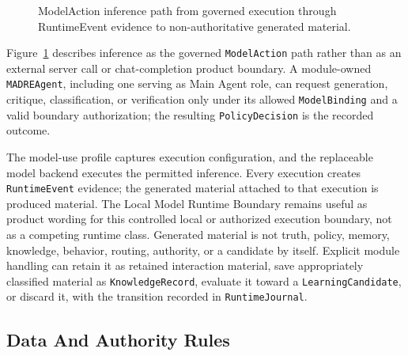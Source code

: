 \documentclass[11pt]{report}
\begin{document}
\begin{figure}[H]
{%
	}
	\caption{ModelAction inference path from governed execution through RuntimeEvent evidence to non-authoritative generated material.}
	\label{fig:madre-model-invocation-action}
\end{figure}

Figure~\ref{fig:madre-model-invocation-action} describes inference as the governed \texttt{ModelAction} path rather than as an external server call or chat-completion product boundary. A module-owned \texttt{MADREAgent}, including one serving as Main Agent role, can request generation, critique, classification, or verification only under its allowed \texttt{ModelBinding} and a valid boundary authorization; the resulting \texttt{PolicyDecision} is the recorded outcome.

The model-use profile captures execution configuration, and the replaceable model backend executes the permitted inference. Every execution creates \texttt{RuntimeEvent} evidence; the generated material attached to that execution is produced material. The Local Model Runtime Boundary remains useful as product wording for this controlled local or authorized execution boundary, not as a competing runtime class. Generated material is not truth, policy, memory, knowledge, behavior, routing, authority, or a candidate by itself. Explicit module handling can retain it as retained interaction material, save appropriately classified material as \texttt{KnowledgeRecord}, evaluate it toward a \texttt{LearningCandidate}, or discard it, with the transition recorded in \texttt{RuntimeJournal}.
\subsection{Data And Authority Rules}
\end{document}
